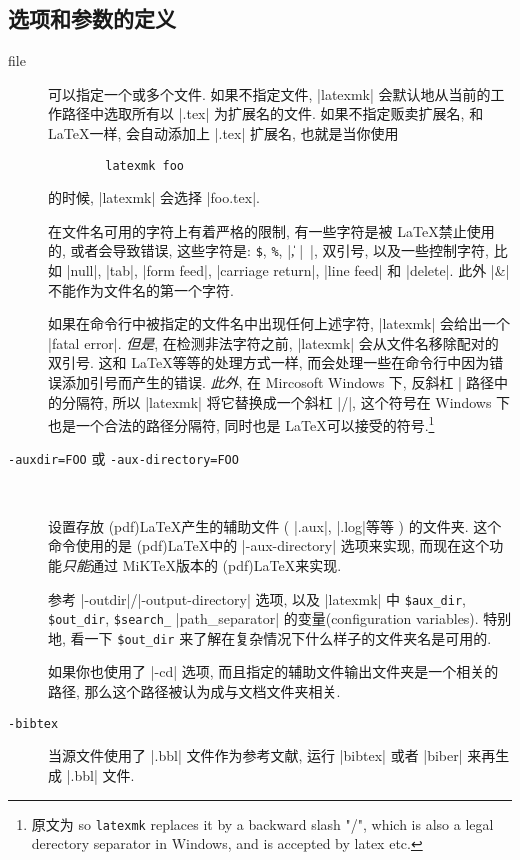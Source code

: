 \documentclass{ctexart}
\begin{document}
\subsection{选项和参数的定义}
    \begin{description}
        \item[file] 可以指定一个或多个文件. 如果不指定文件, |latexmk| 会默认地从当前的工作路径中选取所有以 |.tex| 为扩展名的文件. 如果不指定贩卖扩展名, 和 \LaTeX 一样, 会自动添加上 |.tex| 扩展名, 也就是当你使用
    \begin{Verbatim}
        latexmk foo
    \end{Verbatim} 
        的时候, |latexmk| 会选择 |foo.tex|.

        在文件名可用的字符上有着严格的限制, 有一些字符是被 \LaTeX 禁止使用的, 或者会导致错误, 这些字符是: \texttt{\$}, \texttt{\%}, |\|, |~|, 双引号, 以及一些控制字符, 比如 |null|, |tab|, |form feed|, |carriage return|, |line feed| 和 |delete|. 此外 |&| 不能作为文件名的第一个字符. 

        如果在命令行中被指定的文件名中出现任何上述字符, |latexmk| 会给出一个 |fatal error|. \emph{但是}, 在检测非法字符之前, |latexmk| 会从文件名移除配对的双引号. 这和 \LaTeX 等等的处理方式一样, 而会处理一些在命令行中因为错误添加引号而产生的错误. \emph{此外}, 在 Mircosoft Windows 下, 反斜杠 |\| 是路径中的分隔符, 所以 |latexmk| 将它替换成一个斜杠 |/|, 这个符号在 Windows 下也是一个合法的路径分隔符, 同时也是 \LaTeX 可以接受的符号.\footnote{原文为 so \texttt{latexmk} replaces it by a backward slash "/", which is also a legal derectory separator in Windows, and is accepted by latex etc.}

        \item[\texttt{-auxdir=FOO} 或 \texttt{-aux-directory=FOO}]~
        
        设置存放 (pdf)\LaTeX 产生的辅助文件 ( |.aux|, |.log|等等 ) 的文件夹. 这个命令使用的是 (pdf)\LaTeX 中的 |-aux-directory| 选项来实现, 而现在这个功能\emph{只能}通过 MiK\TeX 版本的 (pdf)\LaTeX 来实现.

        参考 |-outdir|/|-output-directory| 选项, 以及 |latexmk| 中 \verb|$aux_dir|, \verb|$out_dir|, \verb|$search_|
        |path_separator| 的变量(configuration variables). 特别地, 看一下 \verb|$out_dir| 来了解在复杂情况下什么样子的文件夹名是可用的.

        如果你也使用了 |-cd| 选项, 而且指定的辅助文件输出文件夹是一个相关的路径, 那么这个路径被认为成与文档文件夹相关.
        
        \item[\texttt{-bibtex}] 当源文件使用了 |.bbl| 文件作为参考文献, 运行 |bibtex| 或者 |biber| 来再生成 |.bbl| 文件.
        

\end{description}
\end{document}
